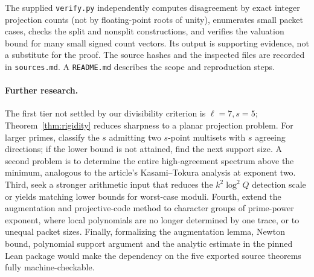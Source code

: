 \documentclass[11pt]{article}
\theoremstyle{remark}\newtheorem{remark}[theorem]{Remark}
\begin{document}
The supplied \texttt{verify.py} independently computes disagreement by exact integer projection counts (not by floating-point roots of unity), enumerates small packet cases, checks the split and nonsplit constructions, and verifies the valuation bound for many small signed count vectors. Its output is supporting evidence, not a substitute for the proof. The source hashes and the inspected files are recorded in \texttt{sources.md}. A \texttt{README.md} describes the scope and reproduction steps.

\paragraph{Further research.} The first tier not settled by our divisibility criterion is $\ell=7,s=5$; Theorem~\ref{thm:rigidity} reduces sharpness to a planar projection problem. For larger primes, classify the $s$ admitting two $s$-point multisets with $s$ agreeing directions; if the lower bound is not attained, find the next support size. A second problem is to determine the entire high-agreement spectrum above the minimum, analogous to the article's Kasami--Tokura analysis at exponent two. Third, seek a stronger arithmetic input that reduces the $k^2\log^2 Q$ detection scale or yields matching lower bounds for worst-case moduli. Fourth, extend the augmentation and projective-code method to character groups of prime-power exponent, where local polynomials are no longer determined by one trace, or to unequal packet sizes. Finally, formalizing the augmentation lemma, Newton bound, polynomial support argument and the analytic estimate in the pinned Lean package would make the dependency on the five exported source theorems fully machine-checkable.
\end{document}
